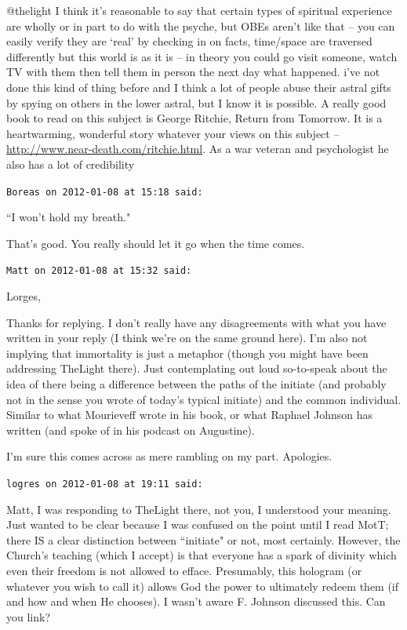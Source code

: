 \begin{footnotesize}
\begin{sffamily}
@thelight I think it's reasonable to say that certain types of spiritual experience are wholly or in part to do with the psyche, but OBEs aren't like that – you can easily verify they are `real' by checking in on facts, time/space are traversed differently but this world is as it is – in theory you could go visit someone, watch TV with them then tell them in person the next day what happened. i've not done this kind of thing before and I think a lot of people abuse their astral gifts by spying on others in the lower astral, but I know it is possible. A really good book to read on this subject is George Ritchie, Return from Tomorrow. It is a heartwarming, wonderful story whatever your views on this subject – \url{http://www.near-death.com/ritchie.html}. As a war veteran and psychologist he also has a lot of credibility


\hfill

\texttt{Boreas on 2012-01-08 at 15:18 said: }

``I won't hold my breath."

That's good. You really should let it go when the time comes.


\hfill

\texttt{Matt on 2012-01-08 at 15:32 said: }

Lorges,

Thanks for replying. I don't really have any disagreements with what you have written in your reply (I think we're on the same ground here). I'm also not implying that immortality is just a metaphor (though you might have been addressing TheLight there). Just contemplating out loud so-to-speak about the idea of there being a difference between the paths of the initiate (and probably not in the sense you wrote of today's typical initiate) and the common individual. Similar to what Mourieveff wrote in his book, or what Raphael Johnson has written (and spoke of in his podcast on Augustine).

I'm sure this comes across as mere rambling on my part. Apologies.


\hfill

\texttt{logres on 2012-01-08 at 19:11 said: }

Matt, I was responding to TheLight there, not you, I understood your meaning. Just wanted to be clear because I was confused on the point until I read MotT; there IS a clear distinction between ``initiate" or not, most certainly. However, the Church's teaching (which I accept) is that everyone has a spark of divinity which even their freedom is not allowed to efface. Presumably, this hologram (or whatever you wish to call it) allows God the power to ultimately redeem them (if and how and when He chooses). I wasn't aware F. Johnson discussed this. Can you link?


\end{sffamily}
\end{footnotesize}
